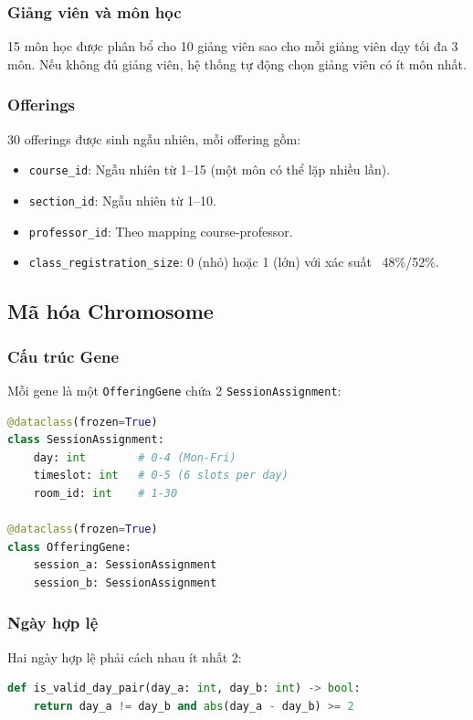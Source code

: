 \subsubsection{Giảng viên và môn học}
15 môn học được phân bổ cho 10 giảng viên sao cho mỗi giảng viên dạy tối đa 3 môn. Nếu không đủ giảng viên, hệ thống tự động chọn giảng viên có ít môn nhất.

\subsubsection{Offerings}
30 offerings được sinh ngẫu nhiên, mỗi offering gồm:
\begin{itemize}
    \item \texttt{course\_id}: Ngẫu nhiên từ 1--15 (một môn có thể lặp nhiều lần).
    \item \texttt{section\_id}: Ngẫu nhiên từ 1--10.
    \item \texttt{professor\_id}: Theo mapping course-professor.
    \item \texttt{class\_registration\_size}: 0 (nhỏ) hoặc 1 (lớn) với xác suất ~48\%/52\%.
\end{itemize}

\subsection{Mã hóa Chromosome}

\subsubsection{Cấu trúc Gene}
Mỗi gene là một \texttt{OfferingGene} chứa 2 \texttt{SessionAssignment}:
\begin{lstlisting}[language=Python, caption=Cấu trúc Gene]
@dataclass(frozen=True)
class SessionAssignment:
    day: int        # 0-4 (Mon-Fri)
    timeslot: int   # 0-5 (6 slots per day)
    room_id: int    # 1-30

@dataclass(frozen=True)
class OfferingGene:
    session_a: SessionAssignment
    session_b: SessionAssignment
\end{lstlisting}

\subsubsection{Ngày hợp lệ}
Hai ngày hợp lệ phải cách nhau ít nhất 2:
\begin{lstlisting}[language=Python, caption=Kiểm tra ngày hợp lệ]
def is_valid_day_pair(day_a: int, day_b: int) -> bool:
    return day_a != day_b and abs(day_a - day_b) >= 2
\end{lstlisting}

